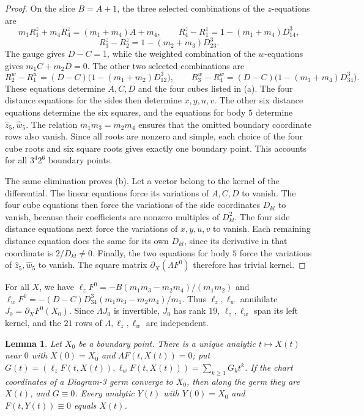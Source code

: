 \documentclass[Threeside,11pt]{article}
\newtheorem{lemma}[theorem]{Lemma}
\theoremstyle{definition}
\theoremstyle{remark}
\numberwithin{equation}{section}
\theoremstyle{remark}
\begin{document}
{\begin{proof}
On the slice $B=A+1$, the three selected combinations of the $z$-equations are
\[
 m_1R^z_1+m_4R^z_4=(m_1+m_4)A+m_4,\qquad
 R^z_4-R^z_1=1-(m_1+m_4)D_{14}^3,
\]
\[
 R^z_3-R^z_2=1-(m_2+m_3)D_{23}^3.
\]
The gauge gives $D-C=1$, while the weighted combination of the $w$-equations gives
$m_1C+m_2D=0$. The other two selected combinations are
\[
 R^w_2-R^w_1=(D-C)\bigl(1-(m_1+m_2)D_{12}^3\bigr),\qquad
 R^w_3-R^w_4=(D-C)\bigl(1-(m_3+m_4)D_{34}^3\bigr).
\]
These equations determine $A,C,D$ and the four cubes listed in (a).
The four distance equations for the sides then determine $x,y,u,v$.
The other six distance equations determine the six squares, and the equations for body $5$
determine $\hat z_5,\hat w_5$.
The relation $m_1m_3=m_2m_4$ ensures that the omitted boundary coordinate rows
also vanish. Since all roots are nonzero and simple, each choice
of the four cube roots and six square roots gives exactly one boundary point.
This accounts for all $3^4 2^6$ boundary points.

The same elimination proves (b). Let a vector belong to the kernel of the differential.
The linear equations force its variations of $A,C,D$ to vanish.
The four cube equations then force the variations of the side coordinates $D_{kl}$ to vanish,
because their coefficients are nonzero multiples of $D_{kl}^2$.
The four side distance equations next force the variations of $x,y,u,v$ to vanish.
Each remaining distance equation does the same for its own $D_{kl}$, since its
derivative in that coordinate is $2/D_{kl}\ne0$.
Finally, the two equations for body $5$ force the variations of $\hat z_5,\hat w_5$ to vanish.
The square matrix $\partial_X(\Lambda F^0)$ therefore has trivial kernel.
\end{proof}

}
{For all $X$, we have $\ell_zF^0=-B(m_1m_3-m_2m_4)/(m_1m_2)$ and
$\ell_wF^0=-(D-C)D_{34}^3(m_1m_3-m_2m_4)/m_1$. Thus $\ell_z,\ell_w$ annihilate
$J_0=\partial_XF^0(X_0)$. Since $\Lambda J_0$ is invertible, $J_0$ has rank $19$,
$\ell_z,\ell_w$ span its left kernel, and the $21$ rows of $\Lambda,\ell_z,\ell_w$ are independent.}

\begin{lemma}\label{lem:d3-graph}
Let $X_0$ be a boundary point.  There is a unique analytic $t\mapsto X(t)$ near $0$ with $X(0)=X_0$ and
$\Lambda F(t,X(t))=0$; put $G(t)=(\ell_zF(t,X(t)),\ell_wF(t,X(t)))=\sum_{k\ge1}G_kt^k$.  If the
chart coordinates of a Diagram-3 germ converge to $X_0$, then along the germ they are $X(t)$, and
$G\equiv0$.  Every analytic $Y(t)$ with $Y(0)=X_0$ and $F(t,Y(t))\equiv0$ equals $X(t)$.
\end{lemma}
\end{document}
